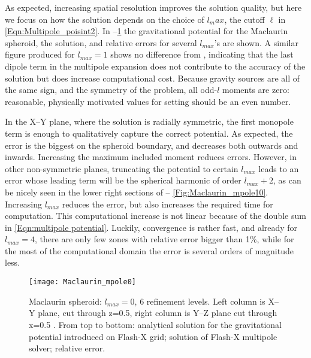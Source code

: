 As expected, increasing spatial resolution improves the solution quality, but here we focus on 
how the solution depends on the choice of $l_max$, the cutoff 
$\ell$ in \eqref{Eqn:Multipole_poisint2}. In --\ref{Fig:Maclaurin_mpole0}
the gravitational potential for the Maclaurin 
spheroid, the \flashx solution, and relative errors for several $l_{max}$'s are shown. 
A similar figure produced for $l_{max}=1$ shows no difference from ,
indicating that the last dipole term in the multipole expansion does not contribute to the accuracy
of the solution but does increase computational cost.
Because gravity sources are all of the same sign, and the symmetry of the 
problem, all odd-$l$ moments are zero: reasonable, physically motivated values for 
setting  should be an even number. 

In the X--Y plane, where the solution is radially symmetric, the first monopole term is enough to qualitatively capture the correct
potential. As expected, the error is the biggest on the spheroid boundary, 
and decreases both outwards and inwards. Increasing the maximum included moment reduces errors.
However, in other non-symmetric planes, 
truncating the potential to certain $l_{max}$ leads to an error whose leading term will be 
the spherical harmonic of order $l_{max}+2$, as can be nicely seen in the lower right sections of 
 -- \ref{Fig:Maclaurin_mpole10}.
Increasing $l_{max}$ reduces the error, but also increases the required time for computation.
This computational increase is not 
linear because of the double sum in \eqref{Eqn:multipole potential}. 
Luckily, convergence is rather fast, and already 
for $l_{max} = 4$, there are only few zones with relative error bigger than 1\%, while for the most of the computational domain the error is several orders of magnitude less. 

\begin{figure}
\begin{center}
{\leavevmode\texttt{[image: Maclaurin\_mpole0]}}
\end{center}
\caption{Maclaurin spheroid: $l_{max} = 0$, 6 refinement levels. Left column is X--Y plane, 
                cut through z=0.5, right column is Y--Z plane cut through x=0.5 .
                From top to bottom: analytical solution for the gravitational potential introduced on 
                Flash-X grid; solution of Flash-X multipole solver; relative error.}
\label{Fig:Maclaurin_mpole0}
\end{figure}


